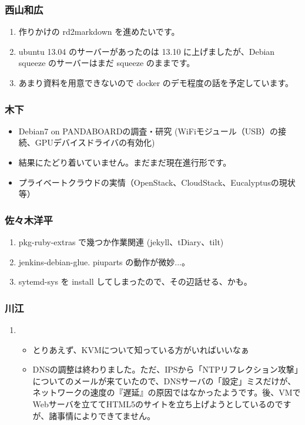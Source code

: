 \documentclass[cjk,dvipdfmx,10pt,compress,%
hyperref={bookmarks=true,bookmarksnumbered=true,bookmarksopen=false,%
colorlinks=false,%
pdftitle={第 81 回 関西 Debian 勉強会},%
pdfauthor={倉敷・のがた・佐々木・かわだ・八津尾},%
pdfsubject={資料},%
}]{beamer}
\begin{document}

\begin{frame}
  \frametitle{ 西山和広 }
  \begin{enumerate}
  \item 作りかけの rd2markdown を進めたいです。
  \item ubuntu 13.04 のサーバーがあったのは 13.10 に上げましたが、Debian squeeze のサーバーはまだ squeeze のままです。
  \item あまり資料を用意できないので docker のデモ程度の話を予定しています。
  \end{enumerate}
\end{frame}

\begin{frame}
  \frametitle{ 木下 }
  \begin{itemize}
  \item Debian7 on PANDABOARDの調査・研究 (WiFiモジュール（USB）の接続、GPUデバイスドライバの有効化)
  \item 結果にたどり着いていません。まだまだ現在進行形です。
  \item プライベートクラウドの実情（OpenStack、CloudStack、Eucalyptusの現状等）
  \end{itemize}
\end{frame}

\begin{frame}
  \frametitle{ 佐々木洋平 }
  \begin{enumerate}
  \item pkg-ruby-extras で幾つか作業関連 (jekyll、tDiary、tilt)
  \item jenkins-debian-glue. piuparts の動作が微妙...。
  \item sytemd-sys を install してしまったので、その辺話せる、かも。
  \end{enumerate}
\end{frame}

\begin{frame}
  \frametitle{ 川江 }
  \begin{enumerate}
  \item
    \begin{itemize}
    \item とりあえず、KVMについて知っている方がいればいいなぁ
    \item DNSの調整は終わりました。ただ、IPSから「NTPリフレクション攻撃」についてのメールが来ていたので、DNSサーバの「設定」ミスだけが、ネットワークの速度の『遅延』の原因ではなかったようです。後、VMでWebサーバを立ててHTML5のサイトを立ち上げようとしているのですが、諸事情によりできてません。
    \end{itemize}
  \end{enumerate}
\end{frame}
\end{document}
